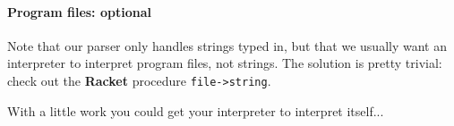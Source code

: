 \documentclass[letterpaper,12pt]{article}
\begin{document}
\paragraph{Program files: optional}

Note that our parser only handles strings typed in, but that we
usually want an interpreter to interpret program files, not strings.
The solution is pretty trivial:
check out the {\bf Racket} procedure {\tt file->string}.

With a little work you could get your interpreter to interpret itself...
\end{document}
